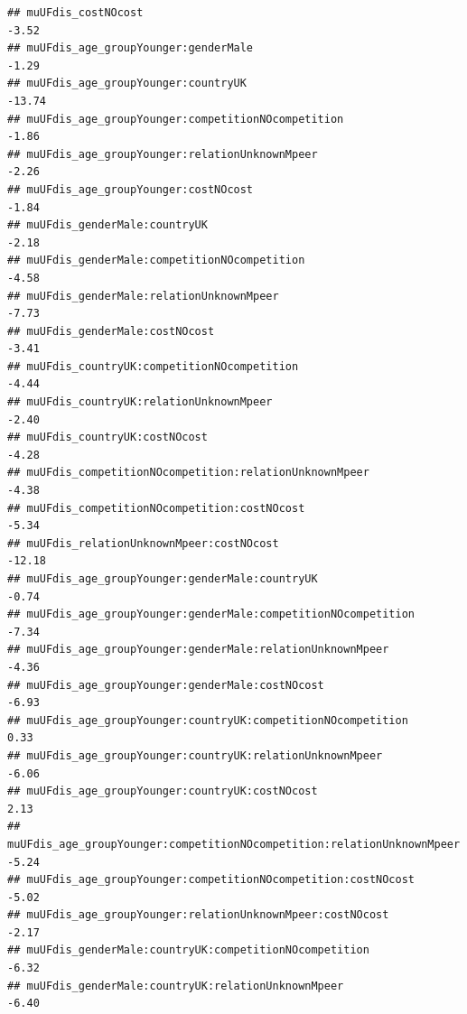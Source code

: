 \documentclass[
]{article}
\begin{document}
\begin{verbatim}
## muUFdis_costNOcost                                                                   -3.52
## muUFdis_age_groupYounger:genderMale                                                  -1.29
## muUFdis_age_groupYounger:countryUK                                                  -13.74
## muUFdis_age_groupYounger:competitionNOcompetition                                    -1.86
## muUFdis_age_groupYounger:relationUnknownMpeer                                        -2.26
## muUFdis_age_groupYounger:costNOcost                                                  -1.84
## muUFdis_genderMale:countryUK                                                         -2.18
## muUFdis_genderMale:competitionNOcompetition                                          -4.58
## muUFdis_genderMale:relationUnknownMpeer                                              -7.73
## muUFdis_genderMale:costNOcost                                                        -3.41
## muUFdis_countryUK:competitionNOcompetition                                           -4.44
## muUFdis_countryUK:relationUnknownMpeer                                               -2.40
## muUFdis_countryUK:costNOcost                                                         -4.28
## muUFdis_competitionNOcompetition:relationUnknownMpeer                                -4.38
## muUFdis_competitionNOcompetition:costNOcost                                          -5.34
## muUFdis_relationUnknownMpeer:costNOcost                                             -12.18
## muUFdis_age_groupYounger:genderMale:countryUK                                        -0.74
## muUFdis_age_groupYounger:genderMale:competitionNOcompetition                         -7.34
## muUFdis_age_groupYounger:genderMale:relationUnknownMpeer                             -4.36
## muUFdis_age_groupYounger:genderMale:costNOcost                                       -6.93
## muUFdis_age_groupYounger:countryUK:competitionNOcompetition                           0.33
## muUFdis_age_groupYounger:countryUK:relationUnknownMpeer                              -6.06
## muUFdis_age_groupYounger:countryUK:costNOcost                                         2.13
## muUFdis_age_groupYounger:competitionNOcompetition:relationUnknownMpeer               -5.24
## muUFdis_age_groupYounger:competitionNOcompetition:costNOcost                         -5.02
## muUFdis_age_groupYounger:relationUnknownMpeer:costNOcost                             -2.17
## muUFdis_genderMale:countryUK:competitionNOcompetition                                -6.32
## muUFdis_genderMale:countryUK:relationUnknownMpeer                                    -6.40

\end{verbatim}
\end{document}
